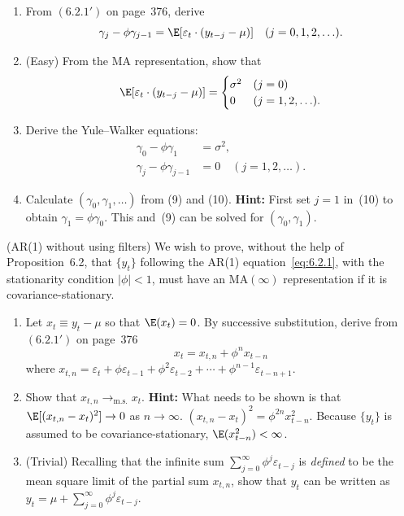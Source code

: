 \begin{problemset}
\begin{enumerate}[label=(\alph*)]
\item From $(6.2.1')$ on page~376, derive
\[
  \gamma_j - \phi \gamma_{j-1} = \E[\varepsilon_t \cdot (y_{t-j} - \mu)]
  \quad (j = 0, 1, 2, \ldots).
\]

\item (Easy) \; From the MA representation, show that
\[
  \E[\varepsilon_t \cdot (y_{t-j} - \mu)] = \begin{cases} \sigma^2 & (j = 0) \\ 0 & (j = 1, 2, \ldots). \end{cases}
\]

\item Derive the Yule--Walker equations:
\begin{align}
  \gamma_0 - \phi \gamma_1 &= \sigma^2, \tag{9} \\
  \gamma_j - \phi \gamma_{j-1} &= 0 \quad (j = 1, 2, \ldots). \tag{10}
\end{align}

\item Calculate $(\gamma_0, \gamma_1, \ldots)$ from (9) and (10). \textbf{Hint:} First set $j = 1$ in~(10) to
obtain $\gamma_1 = \phi \gamma_0$. This and~(9) can be solved for $(\gamma_0, \gamma_1)$.
\end{enumerate}

\exercise[6] (AR(1) without using filters) \; We wish to prove, without the help of Proposition~6.2,
that $\{y_t\}$ following the AR(1) equation~\eqref{eq:6.2.1}, with the stationarity
condition $|\phi| < 1$, must have an $\text{MA}(\infty)$ representation if it is covariance-stationary.

\begin{enumerate}[label=(\alph*)]
\item Let $x_t \equiv y_t - \mu$ so that $\E(x_t) = 0$. By successive substitution, derive from
$(6.2.1')$ on page~376
\[
  x_t = x_{t,n} + \phi^n x_{t-n}
\]
where $x_{t,n} = \varepsilon_t + \phi \varepsilon_{t-1} + \phi^2 \varepsilon_{t-2} + \cdots + \phi^{n-1} \varepsilon_{t-n+1}$.

\item Show that $x_{t,n} \to_{\mathrm{m.s.}} x_t$. \textbf{Hint:} What needs to be shown is that $\E[(x_{t,n} -
x_t)^2] \to 0$ as $n \to \infty$. $(x_{t,n} - x_t)^2 = \phi^{2n} x_{t-n}^2$. Because $\{y_t\}$ is assumed
to be covariance-stationary, $\E(x_{t-n}^2) < \infty$.

\item (Trivial) \; Recalling that the infinite sum $\sum_{j=0}^{\infty} \phi^j \varepsilon_{t-j}$
is \emph{defined} to be the mean square limit of the partial sum $x_{t,n}$, show that $y_t$
can be written as $y_t = \mu + \sum_{j=0}^{\infty} \phi^j \varepsilon_{t-j}$.
\end{enumerate}


\end{problemset}
